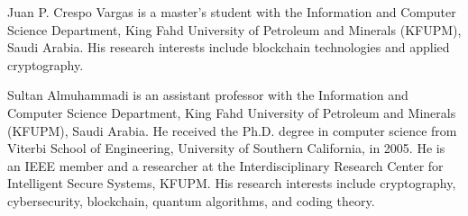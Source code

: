 \documentclass{ieeeaccess}
\begin{document}




\begin{IEEEbiographynophoto}{Juan P. Crespo Vargas}
is a master’s student with the Information and Computer Science Department,
King Fahd University of Petroleum and Minerals (KFUPM), Saudi Arabia.
His research interests include blockchain technologies and applied cryptography.
\end{IEEEbiographynophoto}

\begin{IEEEbiographynophoto}{Sultan Almuhammadi} 
 is an assistant professor with the Information and Computer Science Department, King Fahd University of Petroleum and Minerals (KFUPM), Saudi Arabia. He received the Ph.D. degree in computer science from Viterbi School of Engineering, University of Southern California, in 2005. He is an IEEE member and a researcher at the Interdisciplinary Research Center for Intelligent Secure Systems, KFUPM. His research interests include cryptography, cybersecurity, blockchain, quantum algorithms, and coding theory.
\end{IEEEbiographynophoto}





\EOD
\end{document}
